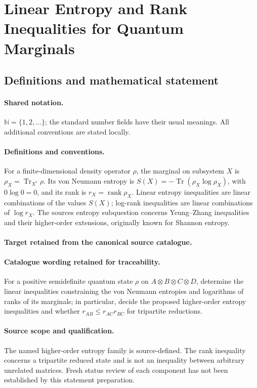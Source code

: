 \documentclass[11pt]{article}
\begin{document}
\section{Linear Entropy and Rank Inequalities for Quantum Marginals}\label{statement}

\subsection{Definitions and mathematical statement}

\paragraph{Shared notation.}$\mathbb N=\{1,2,\ldots\}$; the standard number fields have their usual meanings. All additional conventions are stated locally.


\paragraph{Definitions and conventions.}
For a finite-dimensional density operator $\rho$, the marginal on subsystem $X$ is $\rho_X=\operatorname{Tr}_{X^c}\rho$. Its von Neumann entropy is $S(X)=-\operatorname{Tr}(\rho_X\log\rho_X)$, with $0\log0=0$, and its rank is $r_X=\operatorname{rank}\rho_X$. Linear entropy inequalities are linear combinations of the values $S(X)$; log-rank inequalities are linear combinations of $\log r_X$. The source\textquotesingle s entropy subquestion concerns Yeung--Zhang inequalities and their higher-order extensions, originally known for Shannon entropy.

\paragraph{Target retained from the canonical source catalogue.}
\paragraph{Catalogue wording retained for traceability.}
For a positive semidefinite quantum state $\rho$ on $A\otimes B\otimes C\otimes D$, determine the linear inequalities constraining the von Neumann entropies and logarithms of ranks of its marginals; in particular, decide the proposed higher-order entropy inequalities and whether $r_{AB}\leq r_{AC}r_{BC}$ for tripartite reductions.

\paragraph{Source scope and qualification.}
The named higher-order entropy family is source-defined. The rank inequality concerns a tripartite reduced state and is not an inequality between arbitrary unrelated matrices. Fresh status review of each component has not been established by this statement preparation.
\end{document}
